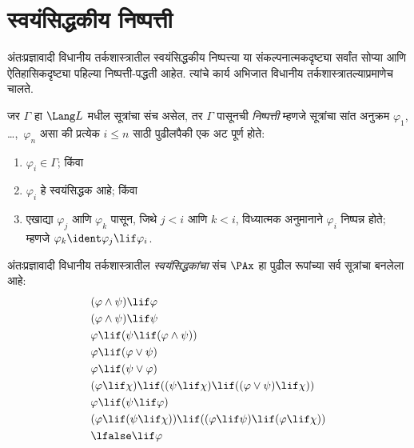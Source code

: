 \section{स्वयंसिद्धकीय निष्पत्ती}\label{int:int:axd:sec}
अंतःप्रज्ञावादी विधानीय तर्कशास्त्रातील स्वयंसिद्धकीय
निष्पत्त्या या संकल्पनात्मकदृष्ट्या सर्वांत सोप्या
आणि ऐतिहासिकदृष्ट्या पहिल्या निष्पत्ती-पद्धती आहेत. त्यांचे कार्य अभिजात विधानीय
तर्कशास्त्रातल्याप्रमाणेच चालते.
\begin{defn}[निष्पन्नता]
जर $\Gamma$ हा $\Lang L$ मधील सूत्रांचा संच
असेल, तर $\Gamma$ पासूनची \emph{निष्पत्ती} म्हणजे
सूत्रांचा सांत अनुक्रम $\varphi_1$, \dots,~$\varphi_n$
असा की प्रत्येक $i \le n$ साठी पुढीलपैकी एक अट
पूर्ण होते:
\begin{enumerate}
\item $\varphi_i \in \Gamma$; किंवा
\item $\varphi_i$ हे स्वयंसिद्धक आहे; किंवा
\item एखाद्या $\varphi_j$ आणि $\varphi_k$ पासून, जिथे $j < i$
  आणि $k < i$, विध्यात्मक अनुमानाने $\varphi_i$ निष्पन्न होते;
  म्हणजे $\varphi_k \ident \varphi_j \lif \varphi_i$.
\end{enumerate}
\end{defn}
\begin{defn}[स्वयंसिद्धके]
अंतःप्रज्ञावादी विधानीय तर्कशास्त्रातील
\emph{स्वयंसिद्धकांचा} संच $\PAx$ हा पुढील रूपांच्या
सर्व सूत्रांचा बनलेला आहे:
\begin{align}
  & (\varphi \land \psi) \lif \varphi \label{int:int:axd:ax:land1}\\
  & (\varphi \land \psi) \lif \psi \label{int:int:axd:ax:land2}\\
  & \varphi \lif (\psi \lif (\varphi \land \psi)) \label{int:int:axd:ax:land3}\\
  & \varphi \lif (\varphi \lor \psi) \label{int:int:axd:ax:lor1}\\
  & \varphi \lif (\psi \lor \varphi) \label{int:int:axd:ax:lor2}\\
  & (\varphi \lif \chi) \lif ((\psi \lif \chi) \lif ((\varphi \lor \psi) \lif \chi)) \label{int:int:axd:ax:lor3}\\
  & \varphi \lif (\psi \lif \varphi) \label{int:int:axd:ax:lif1}\\
  & (\varphi \lif (\psi \lif \chi)) \lif ((\varphi \lif \psi) \lif (\varphi \lif \chi)) \label{int:int:axd:ax:lif2}\\
  & \lfalse \lif \varphi \label{int:int:axd:ax:lfalse1}
\end{align}
\end{defn}
